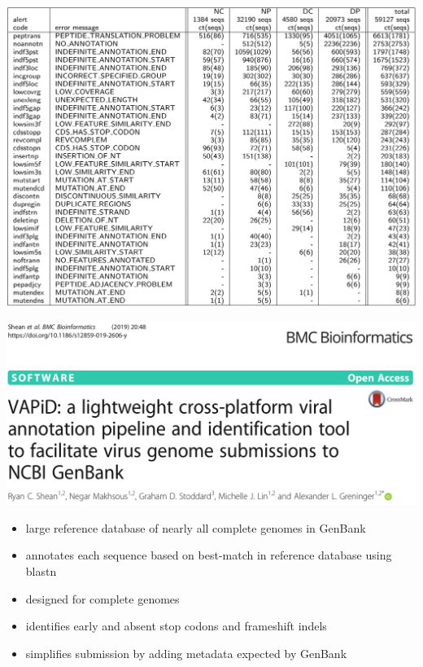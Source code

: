 \documentclass[landscape]{slides}
\begin{document}
\begin{slide}
\begin{center}
\includegraphics[width=10.5in]{figs/ss-alert-counts}
\end{center}

\vfill
\end{slide}
\begin{slide}
\begin{center}
\includegraphics[width=10.5in]{figs/ss-vapid-title}
\end{center}

\small
\begin{itemize}
\item large reference database of nearly all complete genomes in
  GenBank
\item annotates each sequence based on best-match in reference
  database using blastn
\item designed for complete genomes
\item identifies early and absent stop codons and frameshift indels
\item simplifies submission by adding metadata expected by GenBank
\end{itemize}

\vfill
\end{slide}
\end{document}
